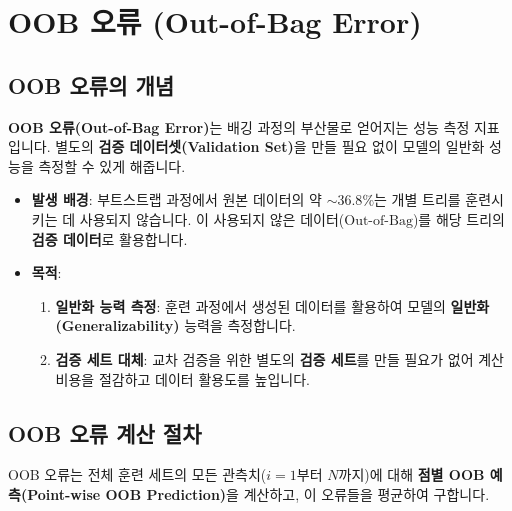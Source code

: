 \documentclass[11pt,a4paper]{book}
\theoremstyle{definition}
\begin{document}
\section{OOB 오류 (Out-of-Bag Error)}
\label{sec:oob_error}

\subsection{OOB 오류의 개념}

\textbf{OOB 오류(Out-of-Bag Error)}는 배깅 과정의 부산물로 얻어지는 성능 측정 지표입니다. 별도의 \textbf{검증 데이터셋(Validation Set)}을 만들 필요 없이 모델의 일반화 성능을 측정할 수 있게 해줍니다.

\begin{itemize}
    \item \textbf{발생 배경}: 부트스트랩 과정에서 원본 데이터의 약 $\sim 36.8\%$는 개별 트리를 훈련시키는 데 사용되지 않습니다. 이 사용되지 않은 데이터($\text{Out-of-Bag}$)를 해당 트리의 \textbf{검증 데이터}로 활용합니다.
    \item \textbf{목적}:
    \begin{enumerate}
        \item \textbf{일반화 능력 측정}: 훈련 과정에서 생성된 데이터를 활용하여 모델의 \textbf{일반화(Generalizability)} 능력을 측정합니다.
        \item \textbf{검증 세트 대체}: 교차 검증을 위한 별도의 \textbf{검증 세트}를 만들 필요가 없어 계산 비용을 절감하고 데이터 활용도를 높입니다.
    \end{enumerate}
\end{itemize}

\subsection{OOB 오류 계산 절차}

OOB 오류는 전체 훈련 세트의 모든 관측치($i=1$부터 $N$까지)에 대해 \textbf{점별 OOB 예측(Point-wise OOB Prediction)}을 계산하고, 이 오류들을 평균하여 구합니다.
\end{document}
